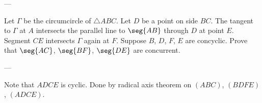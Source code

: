 
---

Let $\Gamma$ be the circumcircle of $\triangle ABC$. Let $D$ be a point on side $BC$. The tangent to $\Gamma$ at $A$ intersects the parallel line to $\seg{AB}$ through $D$ at point $E$. Segment $CE$ intersects $\Gamma$ again at $F$. Suppose $B$, $D$, $F$, $E$ are concyclic. Prove that $\seg{AC}$, $\seg{BF}$, $\seg{DE}$ are concurrent.

---

Note that $ADCE$ is cyclic. Done by radical axis theorem on $(ABC)$, $(BDFE)$, $(ADCE)$.

